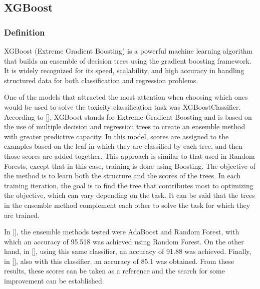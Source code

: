 \subsection{XGBoost}
\subsubsection{Definition}

XGBoost (Extreme Gradient Boosting) is a powerful machine learning algorithm that builds an ensemble of decision trees using the gradient boosting framework. It is widely recognized for its speed, scalability, and high accuracy in handling structured data for both classification and regression problems.

One of the models that attracted the most attention when choosing which ones would be used to solve the toxicity classification task was XGBoostClassifier. According to [], XGBoost stands for Extreme Gradient Boosting and is based on the use of multiple decision and regression trees to create an ensemble method with greater predictive capacity. In this model, scores are assigned to the examples based on the leaf in which they are classified by each tree, and then those scores are added together. This approach is similar to that used in Random Forests, except that in this case, training is done using Boosting. The objective of the method is to learn both the structure and the scores of the trees. In each training iteration, the goal is to find the tree that contributes most to optimizing the objective, which can vary depending on the task. It can be said that the trees in the ensemble method complement each other to solve the task for which they are trained.

In [], the ensemble methods tested were AdaBoost and Random Forest, with which an accuracy of 95.518 was achieved using Random Forest. On the other hand, in [], using this same classifier, an accuracy of 91.88 was achieved. Finally, in [], also with this classifier, an accuracy of 85.1 was obtained. From these results, these scores can be taken as a reference and the search for some improvement can be established.

